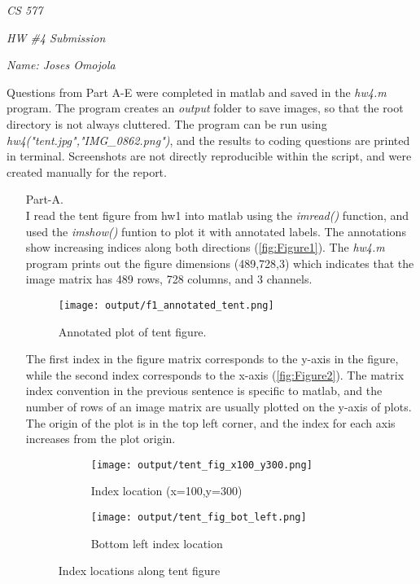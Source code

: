 \documentclass[12pt]{report}
\begin{document}
\centerline{\it CS 577}
\centerline{\it HW \#4 Submission}
\centerline{\it Name: Joses Omojola}

Questions from Part A-E were completed in matlab and saved in the \emph{hw4.m} program. The program creates an \emph{output} folder to save images, 
so that the root directory is not always cluttered. The program can be run using \textit{hw4("tent.jpg","IMG\_0862.png")}, and the results to coding 
questions are printed in terminal. Screenshots are not directly reproducible within the script, and were created manually for the report.

\begin{enumerate}

    \item[Part-A.]
    \ \\
    I read the tent figure from hw1 into matlab using the \emph{imread()} function, and used the \emph{imshow()} funtion to plot it with annotated 
    labels. The annotations show increasing indices along both directions (\autoref{fig:Figure1}). The \emph{hw4.m} program prints out the figure 
    dimensions (489,728,3) which indicates that the image matrix has 489 rows, 728 columns, and 3 channels.

    \begin{figure}[H]
        \centering
        \texttt{[image: output/f1\_annotated\_tent.png]}
        \caption{Annotated plot of tent figure.}
        \label{fig:Figure1}
    \end{figure}

    \FloatBarrier 

    The first index in the figure matrix corresponds to the y-axis in the figure, while the second index corresponds to the x-axis 
    (\autoref{fig:Figure2}). The matrix index convention in the previous sentence is specific to matlab, and the number of rows of 
    an image matrix are usually plotted on the y-axis of plots. The origin of the plot is in the top left corner, and the index 
    for each axis increases from the plot origin. 

    \begin{figure}[!ht]\centering
        \hspace*{-1.2in}
        \begin{subfigure}{0.40\textwidth}
            \texttt{[image: output/tent\_fig\_x100\_y300.png]}
            \caption{Index location (x=100,y=300)}
            \label{fig:Figure2a}
        \end{subfigure}
    \hfil
        \begin{subfigure}{0.40\textwidth}
        \texttt{[image: output/tent\_fig\_bot\_left.png]}
        \caption{Bottom left index location}
        \label{fig:Figure2b}
        \end{subfigure}
        \caption{Index locations along tent figure}
        \label{fig:Figure2}
    \end{figure}


\end{enumerate}
\end{document}

